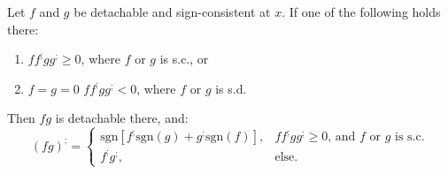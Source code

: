 \documentclass[11pt]{book}
\begin{document}
\begin{theorem}
Let $f$ and $g$ be detachable and sign-consistent at $x$. If one of the following holds there:
\begin{enumerate}
\item $ff^{;}gg^{;}\geq0$, where $f$ or $g$ is s.c., or
\item $f=g=0$
$ff^{;}gg^{;}<0$, where $f$ or $g$ is s.d.
\label{product_rule}
\end{enumerate}

Then $fg$ is detachable there, and: $$\left(fg\right)^{;}=\begin{cases}
\text{sgn}\left[f^{;}\text{sgn}\left(g\right)+g^{;}\text{sgn}\left(f\right)\right], & ff^{;}gg^{;}\geq0\text{, and }f\text{ or }g\text{ is s.c.}\\
f^{;}g^{;}, & \text{else}\text{.}
\end{cases}$$
\label{product_rule}
\end{theorem}
\end{document}
